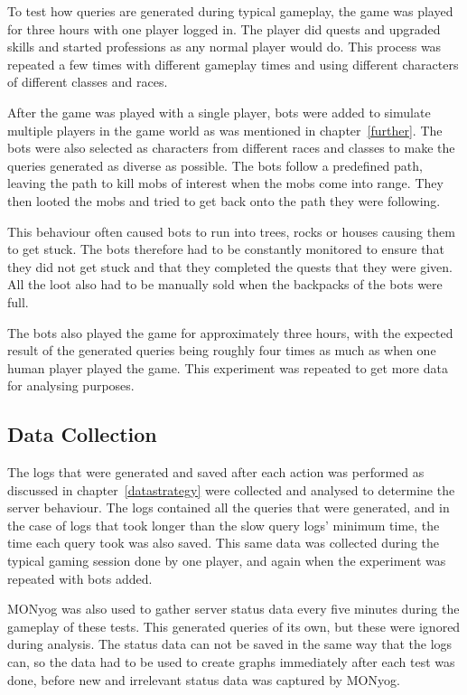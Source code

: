 To test how queries are generated during typical gameplay, the game was played for three hours with one player logged in. The player did quests and upgraded skills and started professions as any normal player would do. This process was repeated a few times with different gameplay times and using different characters of different classes and races.

After the game was played with a single player, bots were added to simulate multiple players in the game world as was mentioned in chapter~\ref{further}. The bots were also selected as characters from different races and classes to make the queries generated as diverse as possible. The bots follow a predefined path, leaving the path to kill mobs of interest when the mobs come into range. They then looted the mobs and tried to get back onto the path they were following. 

This behaviour often caused bots to run into trees, rocks or houses causing them to get stuck. The bots therefore had to be constantly monitored to ensure that they did not get stuck and that they completed the quests that they were given. All the loot also had to be manually sold when the backpacks of the bots were full. 

The bots also played the game for approximately three hours, with the expected result of the generated queries being roughly four times as much as when one human player played the game. This experiment was repeated to get more data for analysing purposes.


\subsection{Data Collection}

The logs that were generated and saved after each action was performed as discussed in chapter~\ref{datastrategy} were collected and analysed to determine the server behaviour. The logs contained all the queries that were generated, and in the case of logs that took longer than the slow query logs' minimum time, the time each query took was also saved. This same data was collected during the typical gaming session done by one player, and again when the experiment was repeated with bots added. 

MONyog was also used to gather server status data every five minutes during the gameplay of these tests. This generated queries of its own, but these were ignored during analysis. The status data can not be saved in the same way that the logs can, so the data had to be used to create graphs immediately after each test was done, before new and irrelevant status data was captured by MONyog.



